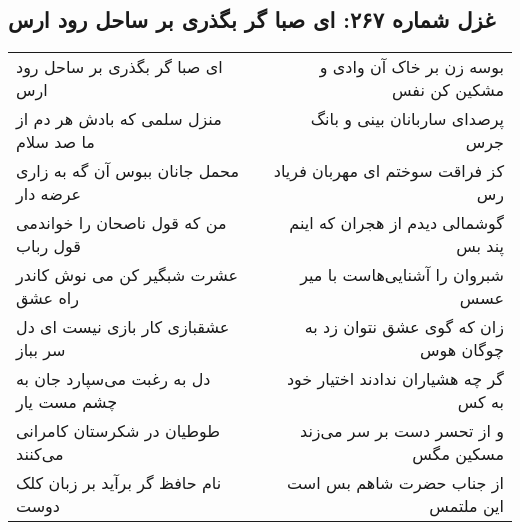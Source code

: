\begin{center}
\section*{غزل شماره ۲۶۷: ای صبا گر بگذری بر ساحل رود ارس}
\label{sec:sh267}
\begin{longtable}{l p{0.5cm} r}
ای صبا گر بگذری بر ساحل رود ارس
&&
بوسه زن بر خاک آن وادی و مشکین کن نفس
\\
منزل سلمی که بادش هر دم از ما صد سلام
&&
پرصدای ساربانان بینی و بانگ جرس
\\
محمل جانان ببوس آن گه به زاری عرضه دار
&&
کز فراقت سوختم ای مهربان فریاد رس
\\
من که قول ناصحان را خواندمی قول رباب
&&
گوشمالی دیدم از هجران که اینم پند بس
\\
عشرت شبگیر کن می نوش کاندر راه عشق
&&
شبروان را آشنایی‌هاست با میر عسس
\\
عشقبازی کار بازی نیست ای دل سر بباز
&&
زان که گوی عشق نتوان زد به چوگان هوس
\\
دل به رغبت می‌سپارد جان به چشم مست یار
&&
گر چه هشیاران ندادند اختیار خود به کس
\\
طوطیان در شکرستان کامرانی می‌کنند
&&
و از تحسر دست بر سر می‌زند مسکین مگس
\\
نام حافظ گر برآید بر زبان کلک دوست
&&
از جناب حضرت شاهم بس است این ملتمس
\\
\end{longtable}
\end{center}
